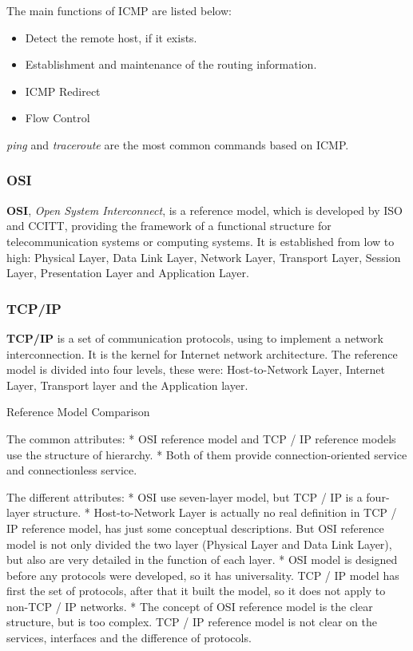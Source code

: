 The main functions of ICMP are listed below:

\begin{itemize}
	\item Detect the remote host, if it exists.  
	\item Establishment and maintenance of the routing information.  
	\item ICMP Redirect  
	\item Flow Control
\end{itemize}

\textit{ping} and \textit{traceroute} are the most common commands based on ICMP. 

\subsubsection{OSI}

\textbf{OSI}, \textit{Open System Interconnect}, is a reference model, which is developed by ISO and CCITT, providing the framework of a functional structure for telecommunication systems or computing systems. It is established from low to high: Physical Layer, Data Link Layer, Network Layer, Transport Layer, Session Layer, Presentation Layer and Application Layer.



\subsubsection{TCP/IP}  

\textbf{TCP/IP} is a set of communication protocols, using to implement a network interconnection. It is the kernel for Internet network architecture. The reference model is divided into four levels, these were: Host-to-Network Layer, Internet Layer, Transport layer and the Application layer.  

Reference Model Comparison  

The common attributes:  
*	OSI reference model and TCP / IP reference models use the structure of hierarchy.  
*	Both of them provide connection-oriented service and connectionless service.  

The different attributes:  
*	OSI use seven-layer model, but TCP / IP is a four-layer structure.  
*	Host-to-Network Layer is actually no real definition in TCP / IP reference model, has just some conceptual descriptions. But OSI reference model is not only divided the two layer (Physical Layer and Data Link Layer), but also are very detailed in the function of each layer.  
*	OSI model is designed before any protocols were developed, so it has universality. TCP / IP model has first the set of protocols, after that it built the model, so it does not apply to non-TCP / IP networks.  
*	The concept of OSI reference model is the clear structure, but is too complex. TCP / IP reference model is not clear on the services, interfaces and the difference of protocols.  

